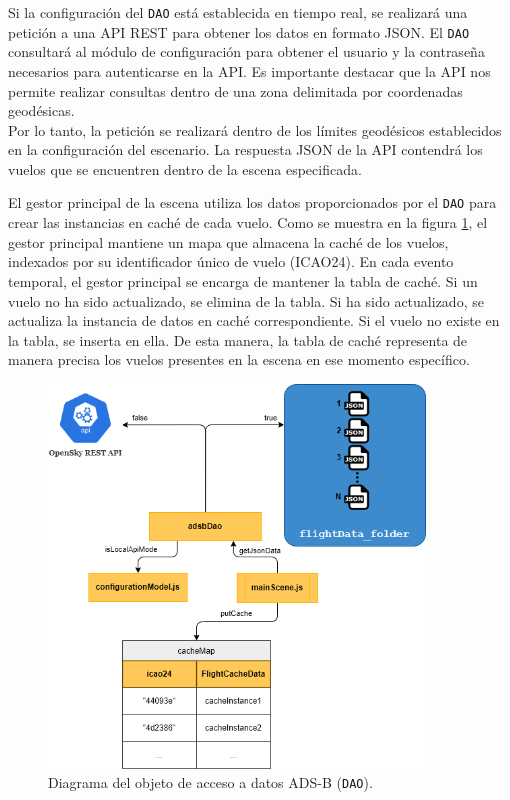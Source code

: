 \documentclass[a4paper, 11pt]{book}
\begin{document}
Si la configuración del \texttt{DAO} está establecida en tiempo real, se realizará una petición a una \textsc{API REST} para obtener los datos en formato \textsc{JSON}. El \texttt{DAO} consultará al módulo de configuración para obtener el usuario y la contraseña necesarios para autenticarse en la \textsc{API}. Es importante destacar que la API nos permite realizar consultas dentro de una zona delimitada por coordenadas geodésicas. \\
Por lo tanto, la petición se realizará dentro de los límites geodésicos establecidos en la configuración del escenario. La respuesta \textsc{JSON} de la \textsc{API} contendrá los vuelos que se encuentren dentro de la escena especificada.

El gestor principal de la escena utiliza los datos proporcionados por el \texttt{DAO} para crear las instancias en caché de cada vuelo. Como se muestra en la figura \ref{fig:dao}, el gestor principal mantiene un mapa que almacena la caché de los vuelos, indexados por su identificador único de vuelo (\textsc{ICAO24}). En cada evento temporal, el gestor principal se encarga de mantener la tabla de caché. Si un vuelo no ha sido actualizado, se elimina de la tabla. Si ha sido actualizado, se actualiza la instancia de datos en caché correspondiente. Si el vuelo no existe en la tabla, se inserta en ella. De esta manera, la tabla de caché representa de manera precisa los vuelos presentes en la escena en ese momento específico.

\begin{figure}[h]
  \centering
  \includegraphics[width=10cm, keepaspectratio]{img/adsbDao.png}
  \caption{Diagrama del objeto de acceso a datos \textsc{ADS-B} (\texttt{DAO}).}
  \label{fig:dao}
\end{figure}
\end{document}
